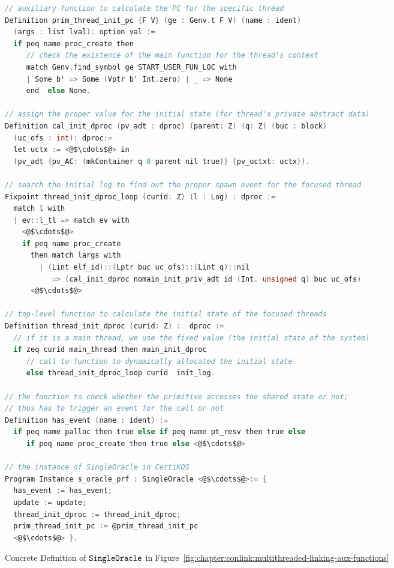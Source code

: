 \begin{figure}
\begin{lstlisting}[language=C, deletekeywords={int}]
// auxiliary function to calculate the PC for the specific thread
Definition prim_thread_init_pc {F V} (ge : Genv.t F V) (name : ident) 
  (args : list lval): option val :=
  if peq name proc_create then 
     // check the existence of the main function for the thread's context
     match Genv.find_symbol ge START_USER_FUN_LOC with
     | Some b' => Some (Vptr b' Int.zero) | _ => None
     end  else None.

// assign the proper value for the initial state (for thread's private abstract data)
Definition cal_init_dproc (pv_adt : dproc) (parent: Z) (q: Z) (buc : block) 
  (uc_ofs : int): dproc:= 
  let uctx := <@$\cdots$@> in 
  (pv_adt {pv_AC: (mkContainer q 0 parent nil true)} {pv_uctxt: uctx}).

// search the initial log to find out the proper spawn event for the focused thread
Fixpoint thread_init_dproc_loop (curid: Z) (l : Log) : dproc :=
  match l with 
  | ev::l_tl => match ev with 
    <@$\cdots$@>
    if peq name proc_create
      then match largs with
        | (Lint elf_id)::(Lptr buc uc_ofs)::(Lint q)::nil
           => (cal_init_dproc nomain_init_priv_adt id (Int. unsigned q) buc uc_ofs)
      <@$\cdots$@>

// top-level function to calculate the initial state of the focused threads
Definition thread_init_dproc (curid: Z) :  dproc :=
  // if it is a main thread, we use the fixed value (the initial state of the system)
  if zeq curid main_thread then main_init_dproc 
     // call to function to dynamically allocated the initial state
     else thread_init_dproc_loop curid  init_log.
     
// the function to check whether the primitive accesses the shared state or not;
// thus has to trigger an event for the call or not 
Definition has_event (name : ident) :=
  if peq name palloc then true else if peq name pt_resv then true else
     if peq name proc_create then true else <@$\cdots$@>
 
// the instance of SingleOracle in CertiKOS 
Program Instance s_oracle_prf : SingleOracle <@$\cdots$@>:= { 
  has_event := has_event;
  update := update;
  thread_init_dproc := thread_init_dproc;
  prim_thread_init_pc := @prim_thread_init_pc
  <@$\cdots$@> }.
\end{lstlisting}
\caption{Concrete Definition of ${\mathrm{\texttt{SingleOracle}}}$ in Figure~\ref{fig:chapter:conlink:multithreaded-linking-aux-functions}}
\label{fig:chapter:certikos:auxfunctions-of-multithreaded-linking-certikos}
\end{figure}

